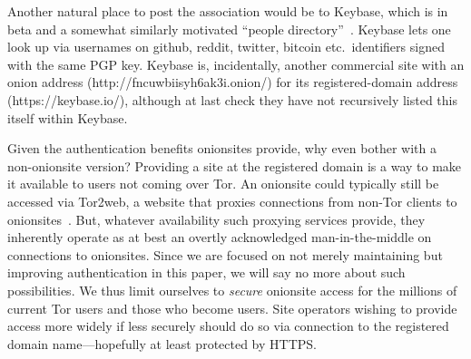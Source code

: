 \documentclass[10pt, conference, compsocconf]{styles/IEEEtran}
\begin{document}
Another natural place to post the association would be to Keybase,
which is in beta and a somewhat similarly motivated ``people
directory''~\cite{keybase}. Keybase lets one look up via usernames on
github, reddit, twitter, bitcoin etc.\ identifiers signed with the
same PGP key. Keybase is, incidentally, another commercial site with
an onion address (http://fncuwbiisyh6ak3i.onion/) for its
registered-domain address (https://keybase.io/), although at last
check they have not recursively listed this itself within Keybase.

Given the authentication benefits onionsites provide, why even bother
with a non-onionsite version? 
%
Providing a site at the registered domain is a way
to make it available to users not coming over Tor.
An onionsite could typically still be accessed via Tor2web, a website
that proxies connections from non-Tor clients to
onionsites~\cite{tor2web}.  But, whatever availability such proxying
services provide, they inherently operate as at best an overtly
acknowledged man-in-the-middle on connections to onionsites.  Since we
are focused on not merely maintaining but improving authentication in
this paper, we will say no more about such possibilities. We thus
limit ourselves to \emph{secure} onionsite access for the millions of
current Tor users and those who become users. Site operators wishing to
provide access more widely if less securely should do so via connection
to the registered domain name---hopefully at least protected by HTTPS.
\end{document}
